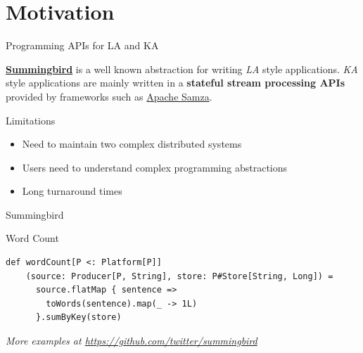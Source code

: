 \documentclass[newPxFont]{beamer}
\begin{document}
%
%

\section{Motivation}


\begin{frame}{Programming APIs for LA and KA}

\href{https://github.com/twitter/summingbird}{\textbf{Summingbird}} is a well known abstraction for writing \textit{LA} style applications.  \textit{KA} style applications are mainly written in a \textbf{stateful stream processing APIs} provided by frameworks such as \href{http://samza.apache.org}{Apache Samza}.

\begin{block}{Limitations}
\begin{itemize}
	\item Need to maintain two complex distributed systems
	\item Users need to understand complex programming abstractions 
	\item Long turnaround times
\end{itemize}
\end{block}

\end{frame}


\begin{frame}[fragile]{Summingbird}
\begin{exampleblock}{Word Count}
\begin{verbatim}
def wordCount[P <: Platform[P]]
    (source: Producer[P, String], store: P#Store[String, Long]) =
      source.flatMap { sentence =>
        toWords(sentence).map(_ -> 1L)
      }.sumByKey(store)
\end{verbatim}
\end{exampleblock}
\vspace{-1.5em}
\begin{flushright}
\tiny\textit{More examples at \url{https://github.com/twitter/summingbird}}
\end{flushright}
\end{frame}
\end{document}
